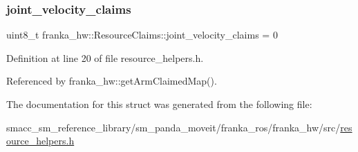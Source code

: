 \subsubsection{\texorpdfstring{joint\+\_\+velocity\+\_\+claims}{joint\_velocity\_claims}}
{\footnotesize\ttfamily uint8\+\_\+t franka\+\_\+hw\+::\+Resource\+Claims\+::joint\+\_\+velocity\+\_\+claims = 0}



Definition at line 20 of file resource\+\_\+helpers.\+h.



Referenced by franka\+\_\+hw\+::get\+Arm\+Claimed\+Map().



The documentation for this struct was generated from the following file\+:\begin{DoxyCompactItemize}
\item 
smacc\+\_\+sm\+\_\+reference\+\_\+library/sm\+\_\+panda\+\_\+moveit/franka\+\_\+ros/franka\+\_\+hw/src/\hyperlink{resource__helpers_8h}{resource\+\_\+helpers.\+h}\end{DoxyCompactItemize}
